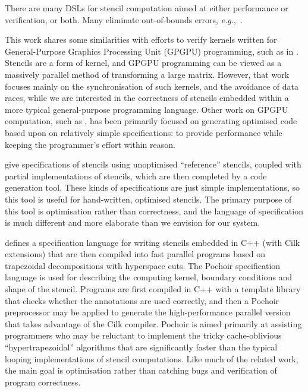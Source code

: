 \documentclass[9pt]{sigplanconf}
\theoremstyle{definition}
\newcommand{\eg}{\emph{e.g.}}
\begin{document}
There are many DSLs for stencil computation aimed at either
performance or verification, or both. Many eliminate out-of-bounds
errors, \eg{},~\citet{DBLP:journals/corr/abs-1109-0777}.

This work shares some similarities with efforts to verify kernels
written for General-Purpose Graphics Processing Unit (GPGPU)
programming, such as in \citet{Blom:2014:SoCP}. Stencils are a form of
kernel, and GPGPU programming can be viewed as a massively parallel
method of transforming a large matrix. However, that work focuses
mainly on the synchronisation of such kernels, and the avoidance of
data races, while we are interested in the correctness of stencils
embedded within a more typical general-purpose programming
language. Other work on GPGPU computation, such as
\citet{Zhang:2012:CGO}, has been primarily focused on generating
optimised code based upon on relatively simple specifications: to
provide performance while keeping the programmer's effort within
reason.

\citet{Solar-Lezama:2007:PLDI} give specifications of stencils using
unoptimised ``reference'' stencils, coupled with partial
implementations of stencils, which are then completed by a code
generation tool. These kinds of specifications are just simple
implementations, so this tool is useful for hand-written, optimised
stencils. The primary purpose of this tool is optimisation rather than
correctness, and the language of specification is much different and
more elaborate than we envision for our system.

\citet{Tang:2011:SPAA} defines a specification language for writing
stencils embedded in C++ (with Cilk extensions) that are then compiled
into fast parallel programs based on trapezoidal decompositions with
hyperspace cuts. The Pochoir specification language is used for
describing the computing kernel, boundary conditions and shape of the
stencil. Programs are first compiled in C++ with a template library
that checks whether the annotations are used correctly, and then a
Pochoir preprocessor may be applied to generate the high-performance
parallel version that takes advantage of the Cilk compiler.  Pochoir
is aimed primarily at assisting programmers who may be reluctant to
implement the tricky cache-oblivious ``hypertrapezoidal'' algorithms
that are significantly faster than the typical looping implementations
of stencil computations. Like much of the related work, the main goal
is optimisation rather than catching bugs and verification of
program correctness.
\end{document}

